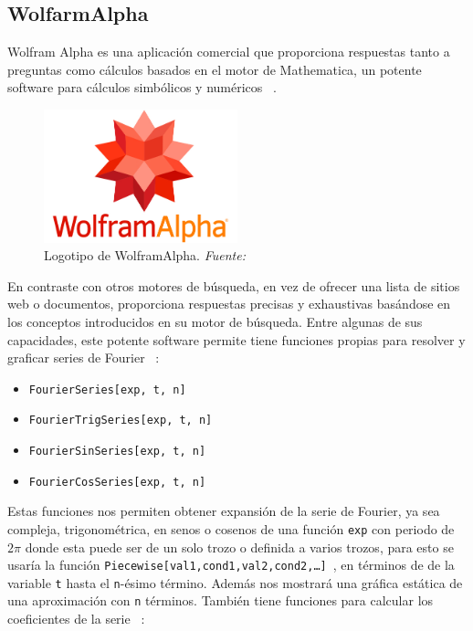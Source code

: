 \subsection{WolfarmAlpha}
Wolfram Alpha es una aplicación comercial que proporciona respuestas tanto a preguntas como cálculos basados en el motor de Mathematica, un potente software para cálculos simbólicos y numéricos ~\cite{wolframMatemathica}. 
\begin{figure}[H]
	\centering
	\includegraphics[width=0.5\textwidth]{img/chapter02/logo_wolfram.jpg}
	\caption[Logotipo de WolframAlpha.]{Logotipo de WolframAlpha. \textit{Fuente: ~\cite{wolframMatemathica}}}
	\label{fig:logo-wolfram}  %
\end{figure}
En contraste con otros motores de búsqueda, en vez de ofrecer una lista de sitios web o documentos, proporciona respuestas precisas y exhaustivas basándose en los conceptos introducidos en su motor de búsqueda. Entre algunas de sus capacidades, este potente software permite tiene funciones propias para resolver y graficar series de Fourier ~\cite{wolfram2024}:
\begin{itemize}
		\item \texttt{FourierSeries[exp, t, n]}
		\item \texttt{FourierTrigSeries[exp, t, n]}
		\item \texttt{FourierSinSeries[exp, t, n]}
		\item \texttt{FourierCosSeries[exp, t, n]}
\end{itemize} 
Estas funciones nos permiten obtener expansión de la serie de Fourier, ya sea compleja, trigonométrica, en senos o cosenos  de una función \texttt{exp} con periodo de $2\pi$ donde esta puede ser de un solo trozo o definida a varios trozos, para esto se usaría la función \texttt{Piecewise[{{val1,cond1},{val2,cond2},…}]}~\cite{wolframMatemathicaPiecewise}, en términos de de la variable \texttt{t} hasta el \texttt{n}-ésimo término. Además nos mostrará una gráfica estática de una aproximación con \texttt{n} términos. También tiene funciones para calcular los coeficientes de la serie ~\cite{wolframMatemathica}:

